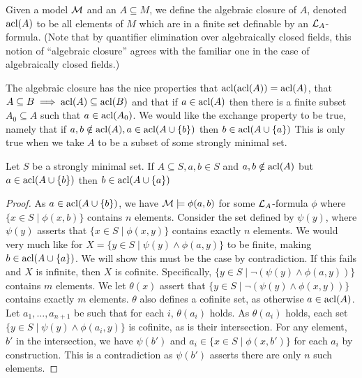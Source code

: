 \begin{definition}\label{definition_algebraic_closure}
Given a model \(\mathcal{M}\) and an \(A \subseteq M\), we define the algebraic closure of \(A\), denoted \(\text{acl}(A)\) to be all elements of \(M\) which are in a finite set definable by an \(\mathcal{L}_A\)-formula. 
(Note that by quantifier elimination over algebraically closed fields, this notion of ``algebraic closure'' agrees with the familiar one in the case of algebraically closed fields.)
\end{definition}

The algebraic closure has the nice properties that \(\text{acl}(\text{acl}(A)) = \text{acl}(A)\), that \(A \subseteq B \implies \text{acl}(A) \subseteq \text{acl}(B)\) and that if \(a \in \text{acl}(A)\) then there is a finite subset \(A_0 \subseteq A\) such that \(a \in \text{acl}(A_0)\).
We would like the exchange property to be true, namely that if \(a, b \notin \text{acl}(A), a \in \text{acl}(A \cup \{b\})\) then \(b \in \text{acl}(A \cup \{a\})\) 
This is only true when we take \(A\) to be a subset of some strongly minimal set.

\begin{theorem}\label{theorem_exchange}
Let \(S\) be a strongly minimal set. If \(A \subseteq S, a, b \in S\) and \(a, b \notin \text{acl}(A)\) but \(a \in \text{acl}(A \cup \{b\})\) then \(b \in \text{acl}(A \cup \{a\})\) 
\end{theorem}

\begin{proof}
As \(a \in \text{acl}(A \cup \{b\})\), we have \(\mathcal{M} \models \phi(a, b)\) for some \(\mathcal{L}_A\)-formula 
\(\phi\) where \(\{x \in S \mid \phi(x, b)\}\) contains \(n\) elements. 
Consider the set defined by \(\psi(y)\), where \(\psi(y)\) asserts that \(\{x \in S \mid \phi(x, y)\}\) contains exactly \(n\) elements. 
We would very much like for \(X = \{y \in S \mid \psi(y) \land \phi(a, y)\}\) to be finite, making \(b \in \text{acl}(A \cup \{a\})\). 
We will show this must be the case by contradiction.
If this fails and \(X\) is infinite, then \(X\) is cofinite. 
Specifically, \(\{y \in S \mid \neg(\psi(y) \land \phi(a, y))\}\) contains \(m\) elements.  
We let \(\theta(x)\) assert that \(\{y \in S \mid \neg(\psi(y) \land \phi(x, y))\}\) contains exactly \(m\) elements.
\(\theta\) also defines a cofinite set, as otherwise \(a \in \text{acl}(A)\).   
Let \(a_1, \ldots, a_{n+1}\) be such that for each \(i\), \(\theta(a_i)\) holds.
As \(\theta(a_i)\) holds, each set \(\{y \in S \mid \psi(y) \land \phi(a_i, y)\}\) is cofinite, as is their intersection. 
For any element, \(b'\) in the intersection, we have \(\psi(b')\) and \(a_i \in \{x \in S \mid \phi(x, b')\}\) for each \(a_i\) by construction.
This is a contradiction as \(\psi(b')\) asserts there are only \(n\) such elements.  
\end{proof}

